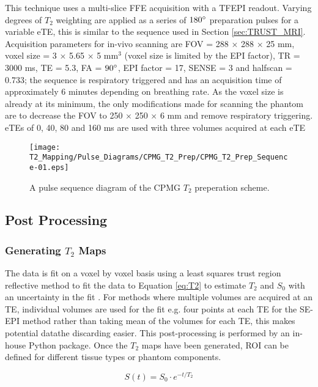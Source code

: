 This technique uses a multi-slice \ac{FFE} acquisition with a \ac{TFEPI} readout. Varying degrees of $T_2$ weighting are applied as a series of $180\degree$ preparation pulses for a variable \ac{eTE}, this is similar to the sequence used in Section \ref{sec:TRUST_MRI}. Acquisition parameters for in-vivo scanning are \ac{FOV} = 288 $\times$ 288 $\times$ 25 mm, voxel size = 3 $\times$ 5.65 $\times$ 5 mm$^3$ (voxel size is limited by the \ac{EPI} factor), \ac{TR} = 3000 ms, \ac{TE} = 5.3, \ac{FA} = $90\degree$, \ac{EPI} factor = 17, \ac{SENSE} = 3 and halfscan = 0.733; the sequence is respiratory triggered and has an acquisition time of approximately 6 minutes depending on breathing rate. As the voxel size is already at its minimum, the only modifications made for scanning the phantom are to decrease the \ac{FOV} to 250 $\times$ 250 $\times$ 6 mm and remove respiratory triggering. \ac{eTE}s of 0, 40, 80 and 160 ms are used with three volumes acquired at each \ac{eTE}

\begin{figure}[H]
	\centering
	\texttt{[image: T2\_Mapping/Pulse\_Diagrams/CPMG\_T2\_Prep/CPMG\_T2\_Prep\_Sequence-01.eps]}
	\caption{A pulse sequence diagram of the \ac{CPMG} $T_2$ preperation scheme.}
	\label{fig:t2_cpmg_t2prep_seq}	
\end{figure}


\subsection{Post Processing}

\subsubsection{Generating $T_2$ Maps}
The data is fit on a voxel by voxel basis using a least squares trust region reflective method to fit the data to Equation \eqref{eq:T2} to estimate $T_2$ and $S_0$ with an uncertainty in the fit \cite{branch_subspace_1999}. For methods where multiple volumes are acquired at an \ac{TE}, individual volumes are used for the fit e.g. four points at each \ac{TE} for the \ac{SE}-\ac{EPI} method rather than taking  mean of the volumes for each \ac{TE}, this makes potential datathe discarding easier. This post-processing is performed by an in-house Python package. Once the $T_2$ maps have been generated, \ac{ROI} can be defined for different tissue types or phantom components.

\begin{equation}
S(t) = S_0 \cdot e^{-t/T_2}
\label{eq:T2}
\end{equation}

